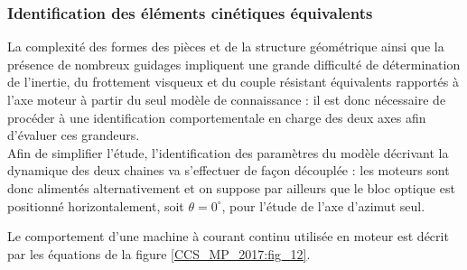 \subsubsection{Identification des éléments cinétiques équivalents}
La complexité des formes des pièces et de la structure géométrique ainsi que la présence de nombreux guidages impliquent une grande difficulté de détermination de l'inertie, du frottement visqueux et du couple résistant équivalents rapportés à l'axe moteur à partir du seul modèle de connaissance : il est donc nécessaire de procéder à une identification comportementale en charge des deux axes afin d'évaluer ces grandeurs.\\
Afin de simplifier l'étude, l'identification des paramètres du modèle décrivant la dynamique des deux chaines va s'effectuer de façon découplée : les moteurs sont donc alimentés alternativement et on suppose par ailleurs que le bloc optique est positionné horizontalement, soit $\theta=0^{\circ}$, pour l'étude de l'axe d'azimut seul.\\

\ifprof
\begin{corrige}
\end{corrige}
\else
\fi


Le comportement d'une machine à courant continu utilisée en moteur est décrit par les équations de la figure \ref{CCS_MP_2017:fig_12}.

